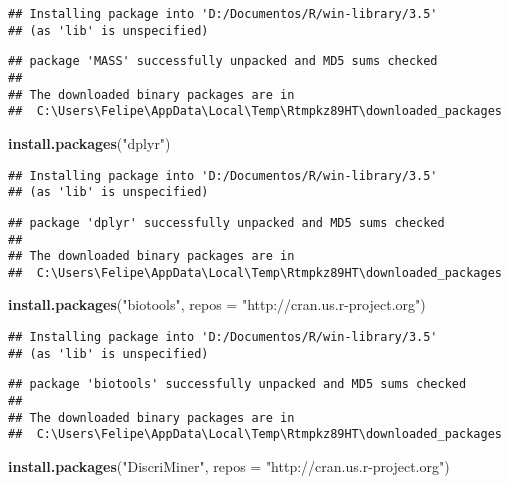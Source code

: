 \documentclass[]{article}
\newenvironment{Shaded}{\begin{snugshade}}{\end{snugshade}}
\newcommand{\KeywordTok}[1]{\textcolor[rgb]{0.13,0.29,0.53}{\textbf{#1}}}
\newcommand{\DataTypeTok}[1]{\textcolor[rgb]{0.13,0.29,0.53}{#1}}
\newcommand{\StringTok}[1]{\textcolor[rgb]{0.31,0.60,0.02}{#1}}
\newcommand{\NormalTok}[1]{#1}
\begin{document}
\begin{verbatim}
## Installing package into 'D:/Documentos/R/win-library/3.5'
## (as 'lib' is unspecified)
\end{verbatim}

\begin{verbatim}
## package 'MASS' successfully unpacked and MD5 sums checked
## 
## The downloaded binary packages are in
##  C:\Users\Felipe\AppData\Local\Temp\Rtmpkz89HT\downloaded_packages
\end{verbatim}

\begin{Shaded}
\begin{Highlighting}[]
\KeywordTok{install.packages}\NormalTok{(}\StringTok{"dplyr"}\NormalTok{)}
\end{Highlighting}
\end{Shaded}

\begin{verbatim}
## Installing package into 'D:/Documentos/R/win-library/3.5'
## (as 'lib' is unspecified)
\end{verbatim}

\begin{verbatim}
## package 'dplyr' successfully unpacked and MD5 sums checked
## 
## The downloaded binary packages are in
##  C:\Users\Felipe\AppData\Local\Temp\Rtmpkz89HT\downloaded_packages
\end{verbatim}

\begin{Shaded}
\begin{Highlighting}[]
\KeywordTok{install.packages}\NormalTok{(}\StringTok{"biotools"}\NormalTok{, }\DataTypeTok{repos =} \StringTok{"http://cran.us.r-project.org"}\NormalTok{)}
\end{Highlighting}
\end{Shaded}

\begin{verbatim}
## Installing package into 'D:/Documentos/R/win-library/3.5'
## (as 'lib' is unspecified)
\end{verbatim}

\begin{verbatim}
## package 'biotools' successfully unpacked and MD5 sums checked
## 
## The downloaded binary packages are in
##  C:\Users\Felipe\AppData\Local\Temp\Rtmpkz89HT\downloaded_packages
\end{verbatim}

\begin{Shaded}
\begin{Highlighting}[]
\KeywordTok{install.packages}\NormalTok{(}\StringTok{"DiscriMiner"}\NormalTok{, }\DataTypeTok{repos =} \StringTok{"http://cran.us.r-project.org"}\NormalTok{)}
\end{Highlighting}
\end{Shaded}
\end{document}

